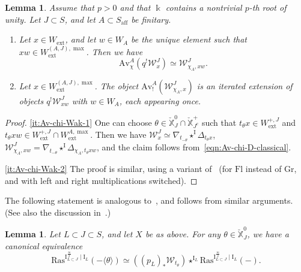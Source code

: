 \documentclass[11pt]{amsart}
\numberwithin{equation}{section}
\theoremstyle{plain}
\newtheorem{lem}[thm]{Lemma}
\theoremstyle{definition}
\newcommand{\I}{{\mathrm I}}
\renewcommand{\k}{\Bbbk}
\newcommand{\sW}{{\mathcal W}}
\newcommand{\X}{{\mathbb X}}
\newcommand{\Xd}{\check{\X}}
\newcommand{\semi}{{{\frac{\infty}{2}}}}
\newcommand{\Av}{\mathrm{Av}}
\newcommand{\ex}{\mathrm{ext}}
\newcommand{\af}{\mathrm{aff}}
\newcommand{\Ras}{\mathrm{Ras}}
\newcommand{\Fl}{\mathrm{Fl}}
\newcommand{\Gr}{\mathrm{Gr}}
\newcommand{\comp}{\mathrm{c}}
\begin{document}
\begin{lem}
\label{lem:Av-chi-Wak}
Assume that $p>0$ and that $\k$ contains a nontrivial $p$-th root of unity. Let $J \subset S$, and let $A \subset S_\af$ be finitary.
\begin{enumerate}
\item
\label{it:Av-chi-Wak-1}
Let $x \in W_\ex$, and let $w \in W_A$ be the unique element such that $xw \in W_\ex^{(A,J), \max}$. Then we have
\[
\Av^A_{\chi}(q^! \sW_x^J) \simeq \sW_{\chi_A,xw}^J.
\]
\item
\label{it:Av-chi-Wak-2}
Let $x \in W_\ex^{(A,J),\max}$. The object $\Av^{A}_{!}(\sW^{J}_{\chi_A, x})$ is an iterated extension of objects $q^! \sW^J_{xw}$ with $w\in W_A$, each appearing once.
\end{enumerate}
\end{lem}

\begin{proof}
\eqref{it:Av-chi-Wak-1}
One can choose $\theta \in \Xd_J^0 \cap \Xd_{J^\comp}^+$ such that $t_\theta x \in W_\ex^{+,J}$ and $t_\theta xw \in W_\ex^{+,J} \cap W_\ex^{A,\max}$. Then we have $\sW_x^J \simeq \nabla_{t_{-\theta}} \star^\I \Delta_{t_\theta x}$, $\sW^J_{\chi_A,xw} = \nabla_{t_{-\theta}} \star^\I \Delta_{\chi_A,t_\theta xw}$, and the claim follows from~\eqref{eqn:Av-chi-D-classical}.

\eqref{it:Av-chi-Wak-2}
The proof is similar, using a variant of~\cite[Lemma~3.6]{ar-model} (for $\Fl$ instead of $\Gr$, and with left and right multiplications switched).
\end{proof}

The following statement is analogous to~\cite[Lemma~5.5]{adr}, and follows from similar arguments. (See also the discussion in~\cite[\S 3.1.10]{DL23}.)

\begin{lem}
\label{lem:Ras-shift-Wak}
Let $L \subset J \subset S$, and let $X$ be as above.
For any $\theta \in \Xd_J^0$, we have a canonical equivalence
\[
\Ras^{\I^\semi_{L \subset J} \mid \I_L} ( - \langle \theta \rangle) \simeq ((p_L)_* \sW_{t_\theta}) \star^{\I_L} \Ras^{\I^\semi_{L \subset J} \mid \I_L}(-).
\]
\end{lem}
\end{document}
